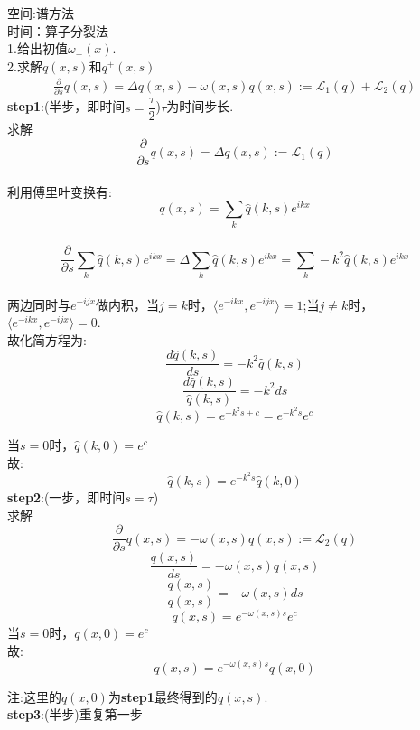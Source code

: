 \documentclass[12pt]{article}
\begin{document}
\begin{CJK}{UTF8}{gkai}
    空间:谱方法\\
  
    时间：算子分裂法 \\
    
    1.给出初值$\omega_-(x)$.\\
    
    2.求解$q(x,s)$和$q^+(x,s)$\\
     \begin{gather}
    \frac{\partial}{\partial s}q(x,s)=\Delta q(x,s)-\omega(x,s)q(x,s)  :=\mathcal{L}_1(q)+ \mathcal{L}_2(q) 
    \end{gather}
    \textbf{step1}:(半步，即时间$s=\dfrac{\tau}{2}$)$\tau$为时间步长.\\
    
    求解$$\frac{\partial}{\partial s}q(x,s)=\Delta q(x,s):=\mathcal{L}_1(q)$$\\
    
    
     利用傅里叶变换有: $$q(x,s)= \sum_{k} \hat{q}(k,s)e^{ikx}$$\\
     
     $$\frac{\partial}{\partial s} \sum_{k}\hat{q}(k,s)e^{ikx} =\Delta\sum_{k}\hat{q} (k,s)e^{ikx}=\sum_{k}-k^2\hat{q}(k,s)e^{ikx}$$\\
     
     两边同时与$e^{-ijx}$做内积，当$j=k$时，$\langle e^{-ikx},e^{-ijx}\rangle=1$;当$j \neq k$时，$\langle e^{-ikx},e^{-ijx}\rangle=0.$\\
     
     故化简方程为:\\
     $$\frac{d\hat{q}(k,s)}{ds} = -k^2\hat{q}(k,s)$$
     $$ \frac{d\hat{q}(k,s)}{\hat{q}(k,s)} = -k^2ds $$
     $$\hat{q}(k,s)=e^{-k^2s+c}=e^{-k^2s}e^{c} $$
     
     当$s=0$时，$\hat{q}(k,0)= e^{c} $\\
     
     故:
     $$\hat{q}(k,s)=e^{-k^2s}\hat{q}(k,0)$$
     \textbf{step2}:(一步，即时间$s=\tau$)\\
     
     求解$$\frac{\partial}{\partial s}q(x,s)=-\omega(x,s)q(x,s)  :=\mathcal{L}_2(q)$$
     $$\dfrac{q(x,s)}{ds}=-\omega(x,s)q(x,s)$$
     $$\dfrac{q(x,s)}{q(x,s)}=-\omega(x,s)ds$$
     $$q(x,s)=e^{-\omega(x,s)s}e^c$$
     当$s=0$时，$q(x,0)= e^{c} $\\
     故:
     $$q(x,s)=e^{-\omega(x,s)s}q(x,0)$$
     
     注:这里的$q(x,0)$为\textbf{step1}最终得到的$q(x,s)$.\\ 
     \textbf{step3}:(半步)重复第一步\\
     

\end{CJK}
\end{document}
